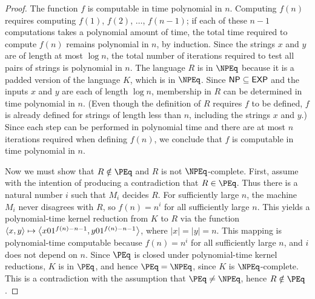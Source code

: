 \begin{proof}
  The function $f$ is computable in time polynomial in $n$.
  Computing $f(n)$ requires computing $f(1)$, $f(2)$, $\dotsc$, $f(n - 1)$; if each of these $n - 1$ computations takes a polynomial amount of time, the total time required to compute $f(n)$ remains polynomial in $n$, by induction.
  Since the strings $x$ and $y$ are of length at most $\log n$, the total number of iterations required to test all pairs of strings is polynomial in $n$.
  The language $R$ is in $\NPEq$ because it is a padded version of the language $K$, which is in $\NPEq$.
  Since ${\mathsf{NP}} \subseteq {\ensuremath{\mathsf{EXP}}}$ and the inputs $x$ and $y$ are each of length $\log n$, membership in $R$ can be determined in time polynomial in $n$.
  (Even though the definition of $R$ requires $f$ to be defined, $f$ is already defined for strings of length less than $n$, including the strings $x$ and $y$.)
  Since each step can be performed in polynomial time and there are at most $n$ iterations required when defining $f(n)$, we conclude that $f$ is computable in time polynomial in $n$.

  Now we must show that $R \notin \PEq$ and $R$ is not $\NPEq$-complete.
  First, assume with the intention of producing a contradiction that $R \in \PEq$.
  Thus there is a natural number $i$ such that $M_i$ decides $R$.
  For sufficiently large $n$, the machine $M_i$ never disagrees with $R$, so $f(n) = n^i$ for all sufficiently large $n$.
  This yields a polynomial-time kernel reduction from $K$ to $R$ via the function $\langle x,y\rangle \mapsto \left\langle x 0 1^{f(n) - n - 1}, y 0 1^{f(n) - n - 1}\right\rangle$, where $|x| = |y| = n$.
  This mapping is polynomial-time computable because $f(n) = n^i$ for all sufficiently large $n$, and $i$ does not depend on $n$.
  Since $\PEq$ is closed under polynomial-time kernel reductions, $K$ is in $\PEq$, and hence $\PEq = \NPEq$, since $K$ is $\NPEq$-complete.
  This is a contradiction with the assumption that $\PEq \neq \NPEq$, hence $R \notin \PEq$.


\end{proof}
